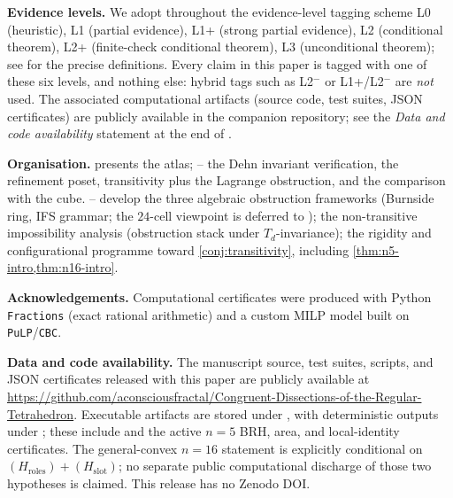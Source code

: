 \documentclass[11pt,a4paper]{article}
\theoremstyle{plain}
\theoremstyle{definition}
\theoremstyle{remark}
\newcommand{\Td}{T_{\!d}}
\newcommand{\Hroles}{H_{\mathrm{roles}}}
\newcommand{\Hslot}{H_{\mathrm{slot}}}
\begin{document}
\medskip

\noindent\textbf{Evidence levels.}
We adopt throughout the evidence-level tagging scheme \textsf{L0} (heuristic),
\textsf{L1} (partial evidence), \textsf{L1+} (strong partial evidence),
\textsf{L2} (conditional theorem), \textsf{L2+} (finite-check conditional
theorem), \textsf{L3} (unconditional theorem); see 
for the precise definitions.  Every claim in this paper is tagged with one
of these six levels, and nothing else: hybrid tags such as \textsf{L2$^{-}$}
or \textsf{L1+}/\textsf{L2$^{-}$} are \emph{not} used.  The associated
computational artifacts (source code, test suites, JSON certificates) are
publicly available in the companion repository; see the \emph{Data and code
availability} statement at the end of .

\medskip

\noindent\textbf{Organisation.}
 presents the atlas; -- the
Dehn invariant verification, the refinement poset, transitivity plus the
Lagrange obstruction, and the comparison with the cube.
-- develop the three algebraic obstruction
frameworks (Burnside ring, IFS grammar; the $24$-cell viewpoint is
deferred to );  the
non-transitive impossibility analysis (obstruction stack under
$\Td$-invariance);  the rigidity and
configurational programme toward \cref{conj:transitivity}, including
\cref{thm:n5-intro,thm:n16-intro}.

\medskip

\noindent\textbf{Acknowledgements.}
Computational certificates were produced with Python \texttt{Fractions}
(exact rational arithmetic) and a custom MILP model built on
\texttt{PuLP}/\texttt{CBC}.

\medskip

\noindent\textbf{Data and code availability.}
The manuscript source, test suites, scripts, and JSON certificates released
with this paper are publicly available at
\url{https://github.com/aconsciousfractal/Congruent-Dissections-of-the-Regular-Tetrahedron}.
Executable artifacts are stored under , with deterministic
outputs under ; these include
 and the active $n=5$ BRH,
area, and local-identity certificates.  The general-convex $n=16$ statement is explicitly conditional on
$(\Hroles)+(\Hslot)$; no separate public computational discharge of those two
hypotheses is claimed.  This release has no Zenodo DOI.
\end{document}

